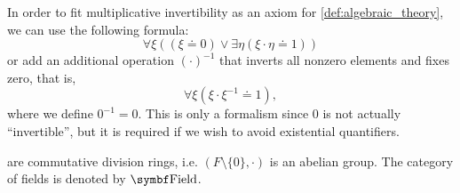 \begin{definition}
\begin{defenum}
    In order to fit multiplicative invertibility as an axiom for \cref{def:algebraic_theory}, we can use the following formula:
    \begin{equation*}
      \forall \xi ((\xi \doteq 0) \lor \exists \eta (\xi \cdot \eta \doteq 1))
    \end{equation*}
    or add an additional operation \( (\cdot)^{-1} \) that inverts all nonzero elements and fixes zero, that is,
    \begin{equation*}
      \forall \xi (\xi \cdot \xi^{-1} \doteq 1),
    \end{equation*}
    where we define \( 0^{-1} = 0 \). This is only a formalism since \( 0 \) is not actually \enquote{invertible}, but it is required if we wish to avoid existential quantifiers.

      are commutative division rings, i.e. \( (F \setminus \{ 0 \}, \cdot) \) is an abelian group. The category of fields is denoted by \( \Cat{Field} \).
  \end{defenum}
\end{definition}

